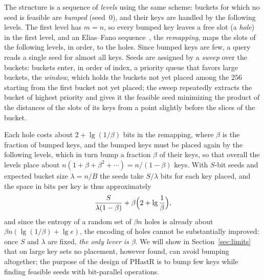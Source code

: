 \documentclass[11pt]{article}
\newcommand{\PHastR}{PHastR\xspace}
\begin{document}
The structure is a sequence of \emph{levels}
using the same scheme: buckets for which no seed is feasible are
\emph{bumped} (seed~$0$), and their keys are handled by the following
levels. The first level has $m=n$, so every bumped key leaves a
free slot (a \emph{hole}) in the first level, and an Elias--Fano
sequence~\cite{EliESRCASF,FanNBRISM,VigBIRSQ}, the \emph{remapping}, maps the slots of
the following levels, in order, to the holes. Since bumped keys are few, a query reads a
single seed for almost all keys. Seeds are assigned by a \emph{sweep} over
the buckets: buckets enter, in order of index, a priority queue that favors
large buckets, the \emph{window}, which holds the buckets not yet placed
among the $256$ starting from the first bucket not yet placed; the sweep
repeatedly extracts the bucket of highest priority and gives it the feasible
seed minimizing the product of the distances of the slots of its keys from
a point slightly before the slices of the bucket.

Each hole costs about $2+\lg(1/\beta)$ bits in the remapping,
where $\beta$ is the fraction of bumped keys, and the bumped keys must be
placed again by the following levels, which in turn bump a fraction $\beta$
of their keys, so that overall the levels place about
$n(1+\beta+\beta^2+\cdots)=n/(1-\beta)$ keys. With $S$-bit seeds and expected
bucket size $\lambda=n/B$ the seeds take $S/\lambda$ bits for each key placed,
and the space in bits per key is thus approximately
\begin{equation}
\label{eq:space}
\frac{S}{\lambda(1-\beta)} + \beta\Bigl(2+\lg\frac1\beta\Bigr),
\end{equation}
and since the entropy of a random set of $\beta n$ holes is already about
$\beta n(\lg(1/\beta)+\lg e)$, the encoding of holes cannot be
substantially improved: once $S$ and $\lambda$ are fixed, \emph{the only
lever is $\beta$}. We will show in Section~\ref{sec:limits} that on large key
sets no placement, however found, can avoid bumping altogether; the purpose of
the design of \PHastR is to bump few keys while finding feasible seeds with
bit-parallel operations.
\end{document}
